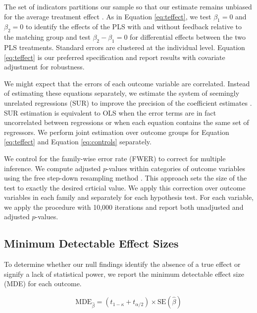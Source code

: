 \documentclass[11pt]{article}
\begin{document}
		The set of indicators partitions our sample so that our estimate remains unbiased for the average treatment effect \parencite{lin_agnostic_2013}. As in Equation \ref{eq:teffect}, we test $\beta_{1} = 0$ and $\beta_{2} = 0$ to identify the effects of the PLS with and without feedback relative to the matching group and test $\beta_{2} - \beta_{1} = 0$ for differential effects between the two PLS treatments. Standard errors are clustered at the individual level. Equation \ref{eq:teffect} is our preferred specification and report results with covariate adjustment for robustness.


		We might expect that the errors of each outcome variable are correlated. Instead of estimating these equations separately, we estimate the system of seemingly unrelated regressions (SUR) to improve the precision of the coefficient estimates \parencite{zellner_efficient_1962}. SUR estimation is equivalent to OLS when the error terms are in fact uncorrelated between regressions or when each equation contains the same set of regressors. We perform joint estimation over outcome groups for Equation \ref{eq:teffect} and Equation \ref{eq:controls} separately.

		We control for the family-wise error rate (FWER) to correct for multiple inference. We compute adjusted $p$-values within categories of outcome variables using the free step-down resampling method \parencite{westfall_resampling-based_1993,anderson_multiple_2008}. This approach sets the size of the test to exactly the desired crticial value. We apply this correction over outcome variables in each family and separately for each hypothesis test. For each variable, we apply the procedure with 10,000 iterations and report both unadjusted and adjusted $p$-values.

	\subsection{Minimum Detectable Effect Sizes}

		To determine whether our null findings identify the absence of a true effect or signify a lack of statistical power, we report the minimum detectable effect size (MDE) for each outcome.

		\begin{equation}
			\mathrm{MDE}_{\hat \beta} = (t_{1-\kappa} + t_{\alpha/2}) \times \mathrm{SE}(\hat \beta)
		\label{eq:mde} \end{equation}
\end{document}
